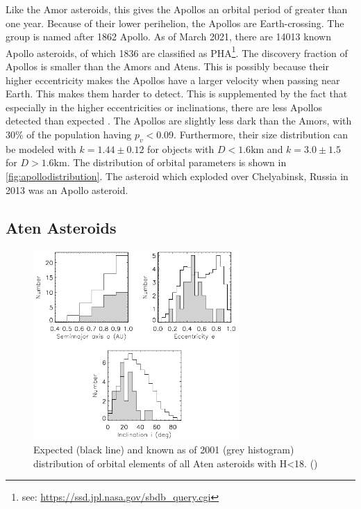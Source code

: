 Like the Amor asteroids, this gives the Apollos an orbital period of greater than one year. Because of their lower perihelion, the Apollos are Earth-crossing. The group is named after 1862 Apollo. As of March 2021, there are 14013 known Apollo asteroids, of which 1836 are classified as PHA\footnote{see: \url{https://ssd.jpl.nasa.gov/sbdb_query.cgi}}. The discovery fraction of Apollos is smaller than the Amors and Atens. This is possibly because their higher eccentricity makes the Apollos have a larger velocity when passing near Earth. This makes them harder to detect. This is supplemented by the fact that especially in the higher eccentricities or inclinations, there are less Apollos detected than expected \cite{debiased}. The Apollos are slightly less dark than the Amors, with $30\%$ of the population having $p_v < 0.09$. Furthermore, their size distribution can be modeled with $k = 1.44\pm0.12$ for objects with $D<1.6\mathrm{km}$ and $k=3.0\pm1.5$ for $D>1.6\mathrm{km}$\cite{subpopulations}. The distribution of orbital parameters is shown in \autoref{fig:apollodistribution}. The asteroid which exploded over Chelyabinsk, Russia in 2013 was an Apollo asteroid.

\newpage
\subsection{Aten Asteroids}
\begin{figure}[htb]
    \centering
    \includegraphics[width=0.7\textwidth]{images/atendist.png}
    \caption{Expected (black line) and known as of 2001 (grey histogram) distribution of orbital elements of all Aten asteroids with H<18. (\cite{debiased})}
    \label{fig:atendistribution}
\end{figure}

